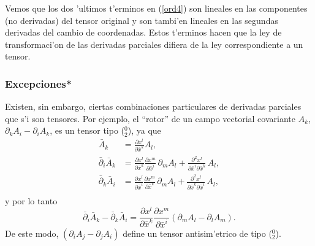 Vemos que los dos 'ultimos t'erminos en (\ref{ord4}) son lineales en las
componentes (no derivadas) del tensor original y son tambi'en lineales en las segundas derivadas del cambio de coordenadas. Estos t'erminos hacen que la ley de transformaci'on de las derivadas parciales difiera de la ley correspondiente a un tensor.

\subsubsection{Excepciones*}
Existen, sin embargo, ciertas combinaciones particulares de derivadas parciales que s'i son tensores. Por ejemplo, el ``rotor'' de un campo vectorial covariante $A_k $, $\partial_k A_i-\partial_iA_k $, es un tensor tipo ($_2^0$), ya que
\begin{align}
\bar{A}_k  & =\frac{\partial x^l}{\partial\bar{x}^k} A_l ,\label{ord6}\\
\bar{\partial}_i\bar{A}_k  & =\frac{\partial x^l}{\partial\bar{x}^k} 
\frac{\partial x^m}{\partial\bar{x}^i}\, \partial_mA_l +
\frac{\partial^2 x^l}{\partial\bar{x}^i\partial\bar{x}^k}\, A_l ,\\
\bar{\partial}_k \bar{A}_i & =\frac{\partial x^l}{\partial\bar{x}^i}
\frac{\partial x^m}{\partial\bar{x}^k}\, \partial_mA_l +
\frac{\partial^2 x^l}{\partial\bar{x}^k\partial\bar{x}^i}\, A_l ,\\
\end{align}
y por lo tanto
\begin{equation}
 \bar{\partial}_i\bar{A}_k -\bar{\partial}_k \bar{A}_i =\frac{\partial x^l}{\partial\bar{x}^k} \frac{\partial x^m}{\partial\bar{x}^i} \left( \partial_m A_l -\partial_l A_m\right) .
\end{equation}
De este modo, $\left(\partial_iA_j -\partial_j A_i\right)$ define un tensor
antisim'etrico de tipo ($_2^0$).

